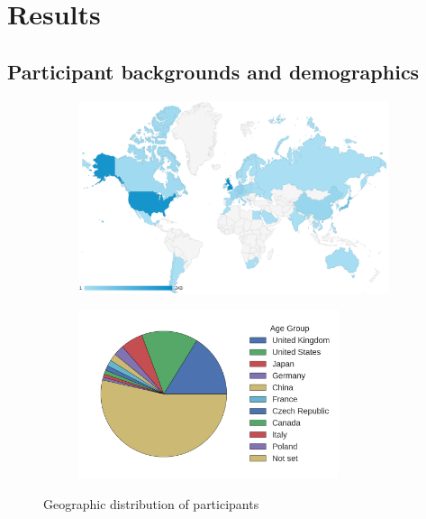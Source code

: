 \documentclass[dissertation.tex]{subfiles}
\begin{document}
\section{Results}

\subsection{Participant backgrounds and demographics}

\begin{figure}[htpb]
  \centering
  \begin{subfigure}[b]{0.98\textwidth}
    \centering
    \includegraphics[width=1.0\linewidth]{Figures/participants-by-country.png}
  \end{subfigure}
  \begin{subfigure}[c]{0.55\textwidth}
    \centering
    \hspace{-1cm}\includegraphics[width=3in]{Figures/user-demographics-pie.png}
  \end{subfigure}
  \begin{subfigure}[c]{0.44\textwidth}
    \centering
    
  \end{subfigure}
  \caption{Geographic distribution of participants}
  \label{fig:user-demographics-pie}
\end{figure}
\end{document}
